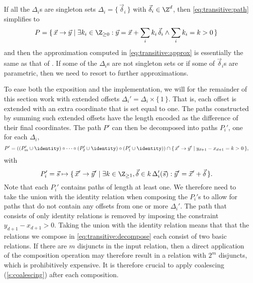 If all the $\Delta_i$s are singleton sets
$\Delta_i = \{\, \vec \delta_i \,\}$ with $\vec \delta_i \in \Z^d$,
then \eqref{eq:transitive:path} simplifies to
\begin{equation}
\label{eq:transitive:singleton}
P = \{\, \vec x \to \vec y \mid
\exists k_i \in \Z_{\ge 0} :
\vec y = \vec x + \sum_i k_i \, \vec \delta_i
\wedge
\sum_i k_i = k > 0
\,\}
\end{equation}
and then the approximation computed in \eqref{eq:transitive:approx}
is essentially the same as that of .
If some of the $\Delta_i$s are not singleton sets or if
some of $\vec \delta_i$s are parametric, then we need
to resort to further approximations.

To ease both the exposition and the implementation, we will for
the remainder of this section work with extended offsets
$\Delta_i' = \Delta_i \times \{\, 1 \,\}$.
That is, each offset is extended with an extra coordinate that is
set equal to one.  The paths constructed by summing such extended
offsets have the length encoded as the difference of their
final coordinates.  The path $P'$ can then be decomposed into
paths $P_i'$, one for each $\Delta_i$,
\begin{equation}
\label{eq:transitive:decompose}
P' = \left(
(P_m' \cup \identity) \circ \cdots \circ
(P_2' \cup \identity) \circ
(P_1' \cup \identity)
\right) \cap
\{\,
\vec x' \to \vec y' \mid y_{d+1} - x_{d+1} = k > 0
\,\}
,
\end{equation}
with
$$
P_i' = \vec s \mapsto \{\, \vec x' \to \vec y' \mid
\exists k \in \Z_{\ge 1}, \vec \delta \in k \, \Delta_i'(\vec s) :
\vec y' = \vec x' + \vec \delta
\,\}
.
$$
Note that each $P_i'$ contains paths of length at least one.
We therefore need to take the union with the identity relation
when composing the $P_i'$s to allow for paths that do not contain
any offsets from one or more $\Delta_i'$.
The path that consists of only identity relations is removed
by imposing the constraint $y_{d+1} - x_{d+1} > 0$.
Taking the union with the identity relation means that
that the relations we compose in \eqref{eq:transitive:decompose}
each consist of two basic relations.  If there are $m$
disjuncts in the input relation, then a direct application
of the composition operation may therefore result in a relation
with $2^m$ disjuncts, which is prohibitively expensive.
It is therefore crucial to apply coalescing (\autoref{s:coalescing})
after each composition.

